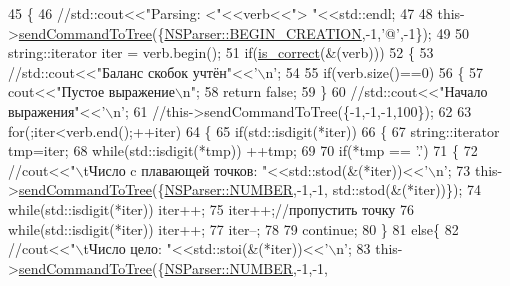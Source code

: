 \begin{DoxyCode}
45 \{
46     \textcolor{comment}{//std::cout<<"Parsing: <"<<verb<<"> "<<std::endl;}
47 
48     this->\hyperlink{classParser_ac61a1fedefe50ed900f0e65c029053c1}{sendCommandToTree}(\{\hyperlink{namespaceNSParser_aca012df556c0413c6166348fdd62c4eba3b1af1d878b1d699d8ac8080125f8793}{NSParser::BEGIN\_CREATION},-1,\textcolor{charliteral}{'@'},-1\});
49 
50     string::iterator iter = verb.begin();
51     \textcolor{keywordflow}{if}(\hyperlink{classParser_a2debdde495ea6985cdb52cbe026d7a22}{is\_correct}(&(verb)))
52     \{
53         \textcolor{comment}{//std::cout<<"Баланс скобок учтён"<<'\(\backslash\)n';}
54 
55         \textcolor{keywordflow}{if}(verb.size()==0)
56         \{
57             cout<<\textcolor{stringliteral}{"Пустое выражение\(\backslash\)n"};
58             \textcolor{keywordflow}{return} \textcolor{keyword}{false};
59         \}
60         \textcolor{comment}{//std::cout<<"Начало выражения"<<'\(\backslash\)n';}
61         \textcolor{comment}{//this->sendCommandToTree(\{-1,-1,-1,100\});}
62 
63         \textcolor{keywordflow}{for}(;iter<verb.end();++iter)
64         \{
65             \textcolor{keywordflow}{if}(std::isdigit(*iter))
66             \{
67                 string::iterator tmp=iter;
68                 \textcolor{keywordflow}{while}(std::isdigit(*tmp)) ++tmp;
69 
70                 \textcolor{keywordflow}{if}(*tmp == \textcolor{charliteral}{'.'})
71                 \{
72                     \textcolor{comment}{//cout<<"\(\backslash\)tЧисло c плавающей точков: "<<std::stod(&(*iter))<<'\(\backslash\)n';}
73                     this->\hyperlink{classParser_ac61a1fedefe50ed900f0e65c029053c1}{sendCommandToTree}(\{\hyperlink{namespaceNSParser_aca012df556c0413c6166348fdd62c4ebaa10e0f3b6b9d7ae45b425f5cda0ef15c}{NSParser::NUMBER},-1,-1,
      std::stod(&(*iter))\});
74                     \textcolor{keywordflow}{while}(std::isdigit(*iter)) iter++;
75                     iter++;\textcolor{comment}{//пропустить точку}
76                     \textcolor{keywordflow}{while}(std::isdigit(*iter)) iter++;
77                     iter--;
78 
79                     \textcolor{keywordflow}{continue};
80                 \}
81                 \textcolor{keywordflow}{else}\{
82                     \textcolor{comment}{//cout<<"\(\backslash\)tЧисло цело: "<<std::stoi(&(*iter))<<'\(\backslash\)n';}
83                     this->\hyperlink{classParser_ac61a1fedefe50ed900f0e65c029053c1}{sendCommandToTree}(\{\hyperlink{namespaceNSParser_aca012df556c0413c6166348fdd62c4ebaa10e0f3b6b9d7ae45b425f5cda0ef15c}{NSParser::NUMBER},-1,-1,

\end{DoxyCode}
